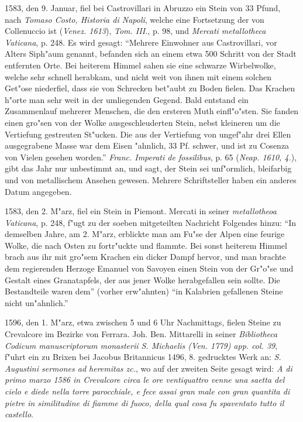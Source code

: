 \documentclass[a4paper, 11pt, oneside, polutonikogreek, german]{article}
\begin{document}
1583, den 9. Januar, fiel bei Castrovillari in Abruzzo ein Stein von 33 Pfund, nach \emph{Tomaso Costo, Historia di Napoli}, welche eine Fortsetzung der von Collenuccio ist (\emph{Venez. 1613}), \emph{Tom. III.}, p. 98, und \emph{Mercati metallotheca Vaticana}, p. 248. Es wird gesagt: "`Mehrere Einwohner aus Castrovillari, vor Alters Siph"aum genannt, befanden sich an einem etwa 500 Schritt von der Stadt entfernten Orte. Bei heiterem Himmel sahen sie eine schwarze Wirbelwolke, welche sehr schnell herabkam, und nicht weit von ihnen mit einem solchen Get"ose niederfiel, dass sie von Schrecken bet"aubt zu Boden fielen. Das Krachen h"orte man sehr weit in der umliegenden Gegend. Bald entstand ein Zusammenlauf mehrerer Menschen, die den ersteren Muth einfl"o"sten. Sie fanden einen gro"sen von der Wolke ausgeschleuderten Stein, nebst kleineren um die Vertiefung gestreuten St"ucken. Die aus der Vertiefung von ungef"ahr drei Ellen ausgegrabene Masse war dem Eisen "ahnlich, 33 Pf. schwer, und ist zu Cosenza von Vielen gesehen worden."' \emph{Franc. Imperati de fossilibus}, p. 65 (\emph{Neap. 1610, 4.}), gibt das Jahr nur unbestimmt an, und sagt, der Stein sei unf"ormlich, bleifarbig und von metallischem Ansehen gewesen. Mehrere Schriftsteller haben ein anderes Datum angegeben.

1583, den 2. M"arz, fiel ein Stein in Piemont. Mercati in seiner \emph{metallotheoa Vaticana}, p. 248, f"ugt zu der soeben mitgeteilten Nachricht Folgendes hinzu: "`In demselben Jahre, am 2. M"arz, erblickte man am Fu"se der Alpen eine feurige Wolke, die nach Osten zu fortr"uckte und flammte. Bei sonst heiterem Himmel brach aus ihr mit gro"sem Krachen ein dicker Dampf hervor, und man brachte dem regierenden Herzoge Emanuel von Savoyen einen Stein von der Gr"o"se und Gestalt eines Granatapfels, der aus jener Wolke herabgefallen sein sollte. Die Bestandteile waren dem"' (vorher erw"ahnten) "`in Kalabrien gefallenen Steine nicht un"ahnlich."'

1596, den 1. M"arz, etwa zwischen 5 und 6 Uhr Nachmittags, fielen Steine zu Crevalcore im Bezirke von Ferrara. Joh. Ben. Mittarelli in seiner \emph{Bibliotheca Codicum manuscriptorum monasterii S. Michaelis (Ven. 1779) app. col. 39}, f"uhrt ein zu Brixen bei Jacobus Britannicus 1496, 8. gedrucktes Werk an: \emph{S. Augustini sermones ad heremitas zc.}, wo auf der zweiten Seite gesagt wird: \emph{A di primo marzo 1586 in Crevalcore circa le ore ventiquattro venne una saetta del cielo e diede nella torre parocchiale, e fece assai gran male con gran quantita di pietre in similitudine di fiamme di fuoco, della qual cosa fu spaventato tutto il castello}.
\end{document}
